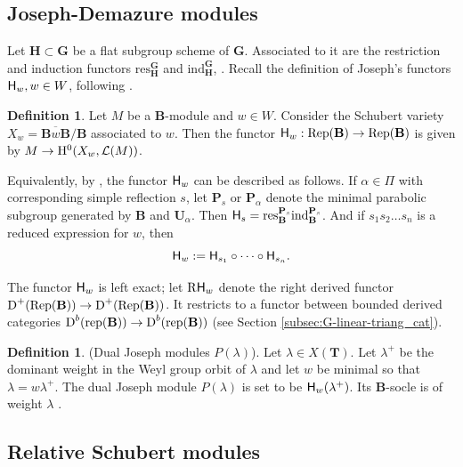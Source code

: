 \documentclass[sn-mathphys-num]{sn-jnl}%
\newcommand{\Ll}{\mathcal L}
\newcommand{\rep}{{\mathrm{rep}}}
\newcommand{\ind}{{\mathrm{ind}}}
\newcommand{\res}{{\mathrm{res}}}
\newcommand{\Rep}{{\mathrm{Rep}}}
\newcommand*{\Dd}{\mathop{\mathrm D\kern0pt}\nolimits}
\newcommand{\sH}{{\sf H}}
\newcommand{\bg}{\mathbf G}
\newcommand{\fb}{\mathbf B}
\newcommand{\bt}{\mathbf T}
\newcommand{\bp}{\mathbf P}
\newcommand{\bh}{\mathbf H}
\newcommand{\bu}{\mathbf U}
\newcommand{\fX}{{ X}}
\theoremstyle{definition}
\newtheorem{definition}[theorem]{Definition}%
\begin{document}
\subsection{Joseph-Demazure modules}\label{subsec:J-D}

Let $ \bh\subset  \bg$ be a flat subgroup scheme of $ \bg$. 
Associated to it are the restriction and induction functors ${\res}_{ \bh}^{ \bg}$ and ${\ind}_{ \bh}^{ \bg}$, \cite[I, Section 3.1]{Jan}. Recall the definition of Joseph's functors ${\sH}_w, w\in W$, following \cite{WvdK}. 


\begin{definition}\label{def:Joseph_functor}
Let $M$ be a $\fb$-module and  $w\in W$. 
Consider the Schubert variety $\fX_w=\overline{\fb w\fb}/\fb$ associated to $w$. Then the functor ${\sH}_w:{\Rep}( \fb)\rightarrow {\Rep}( \fb)$ is given by $M\rightarrow {\rm H}^0(\fX_w,\Ll (M))$. 
\end{definition}

Equivalently, by \cite[Proposition 2.2.5]{WvdKTata}, the functor ${\sH}_w$ can be described as follows.
If $\alpha\in \Pi$ with corresponding simple reflection $s$, let $\bp_s$ or $\bp_\alpha$ denote the minimal parabolic subgroup generated by $\fb$ and ${ \bu}_{\alpha}$. 
Then $\sH_s={\res}_{\fb}^{{ \bp}_{s}}{\ind}_{\fb}^{{ \bp}_{s}}$. And if  $s_{1}s_{2}\dots s_{n}$ is   a reduced expression for $w$, then
$${\sH}_w:=\sH_{s_1}\circ\dots\circ \sH_{s_n}.$$
 

The functor ${\sH}_w$ is left exact; let ${\rm R}{\sH}_w$ denote the right derived functor $\Dd ^+({\Rep}( \fb))\rightarrow \Dd ^+({\Rep}( \fb))$. It restricts to a functor between bounded derived categories  $\Dd ^b({\rep}( \fb))\rightarrow \Dd ^b({\rep}( \fb))$ (see Section \ref{subsec:G-linear-triang_cat}).

\begin{definition}\label{def:dualJosephmod}(Dual Joseph modules $P(\lambda)$).
Let $\lambda \in X( \bt)$. Let $\lambda^+$ be the dominant weight in the Weyl group orbit of $\lambda$ and let $w$ be minimal so that $\lambda=w\lambda^+$. The dual Joseph module $P(\lambda)$ is set to be ${\sH}_w(\lambda ^+)$. Its $\fb$-socle is of weight $\lambda$ \cite[Lemma 2.2.9]{WvdKTata}.
\end{definition}

\subsection{Relative Schubert modules}\label{subsec:Schubfilt}
\end{document}
